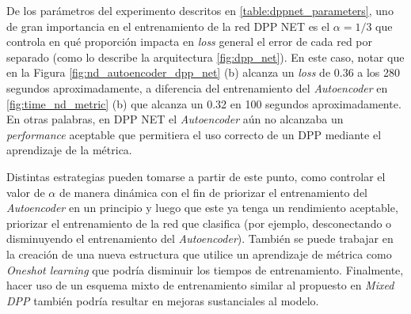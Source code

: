 De los parámetros del experimento descritos en \ref{table:dppnet_parameters}, uno de gran importancia en el entrenamiento de la red DPP NET es el $\alpha = 1/3$ que controla en qué proporción impacta en \textit{loss} general el error de cada red por separado (como lo describe la arquitectura \ref{fig:dpp_net}). En este caso, notar que en la Figura \ref{fig:nd_autoencoder_dpp_net} (b) alcanza un \textit{loss} de 0.36 a los 280 segundos aproximadamente, a diferencia del entrenamiento del \textit{Autoencoder} en \ref{fig:time_nd_metric} (b) que alcanza un 0.32 en 100 segundos aproximadamente. En otras palabras, en DPP NET el \textit{Autoencoder} aún no alcanzaba un \textit{performance} aceptable que permitiera el uso correcto de un DPP mediante el aprendizaje de la métrica.

\vspace{0.2cm}

Distintas estrategias pueden tomarse a partir de este punto, como controlar el valor de $\alpha$ de manera dinámica con el fin de priorizar el entrenamiento del \textit{Autoencoder} en un principio y luego que este ya tenga un rendimiento aceptable, priorizar el entrenamiento de la red que clasifica (por ejemplo, desconectando o disminuyendo el entrenamiento del \textit{Autoencoder}). También se puede trabajar en la creación de una nueva estructura que utilice un aprendizaje de métrica como \textit{Oneshot learning} que podría disminuir los tiempos de entrenamiento. Finalmente, hacer uso de un esquema mixto de entrenamiento similar al propuesto en \textit{Mixed DPP} también podría resultar en mejoras sustanciales al modelo. 


